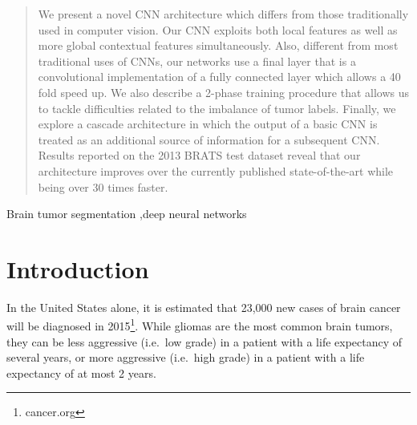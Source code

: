 \documentclass[final,5p,times,twocolumn]{elsarticle}
\begin{document}
\begin{frontmatter}
\begin{abstract}
  We present a novel CNN architecture which differs from those traditionally used in computer vision.  Our CNN exploits both local features as well as more global contextual features simultaneously.  Also, different from most traditional uses of CNNs, our networks use a final layer that is a convolutional implementation of a fully connected layer which allows a 40 fold speed up. We also describe a 2-phase training procedure that allows us to tackle difficulties related to the imbalance of tumor labels. Finally, we explore a cascade architecture in which the output of a basic CNN is treated as an additional source of information for a subsequent CNN. Results reported on the 2013 BRATS test dataset reveal that our architecture improves over the currently published state-of-the-art while being over 30 times faster.

\end{abstract}



\begin{keyword}


Brain tumor segmentation \sep deep neural networks


\end{keyword}



\end{frontmatter}


\section{Introduction}


In the United States alone, it is estimated that 23,000 new cases of brain cancer will be diagnosed in 2015\footnote{cancer.org}. While gliomas are the most common brain tumors, they can be less aggressive (i.e.\ low grade) in a patient with a life expectancy of several years, or more aggressive (i.e.\ high grade) in a patient with a life expectancy of at most 2 years.

\end{document}
